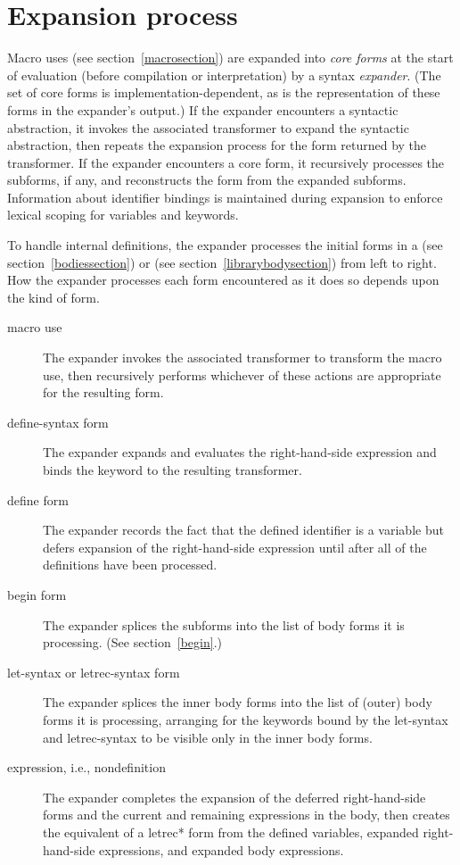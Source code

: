 \chapter{Expansion process}
\label{expansionchapter}

Macro uses (see section~\ref{macrosection}) are expanded into \textit{core
forms} at the start of evaluation (before compilation or interpretation)
by a syntax \emph{expander}.
(The set of core forms is implementation-dependent, as is the
representation of these forms in the expander's output.)
If the expander encounters a syntactic abstraction, it invokes
the associated transformer to expand the syntactic abstraction, then
repeats the expansion process for the form returned by the transformer.
If the expander encounters a core form, it recursively
processes the subforms, if any, and reconstructs the form from the
expanded subforms.
Information about identifier bindings is maintained during expansion
to enforce lexical scoping for variables and keywords.

To handle internal definitions, the expander processes the initial
forms in a  (see section~\ref{bodiessection}) or
 (see section~\ref{librarybodysection})
from left to
right.  How the expander processes each form encountered as it does so
depends upon the kind of form.

\begin{description}
\item[macro use]
The expander invokes the associated transformer to transform the macro
use, then recursively performs whichever of these actions are appropriate
for the resulting form.

\item[{\cf define-syntax} form]
The expander expands and evaluates the right-hand-side expression and binds the
keyword to the resulting transformer.

\item[{\cf define} form]
The expander records the fact that the defined identifier is a variable but defers
expansion of the right-hand-side expression until after all of the
definitions have been processed.

\item[{\cf begin} form]
The expander splices the subforms into the list of body forms it is
processing.  (See section~\ref{begin}.)

\item[{\cf let-syntax} or {\cf letrec-syntax} form]
The expander splices the inner body forms into the list of (outer) body forms it is
processing, arranging for the keywords bound by the {\cf let-syntax}
and {\cf letrec-syntax} to be visible only in the inner body forms.

\item[expression, i.e., nondefinition]
The expander completes the expansion of the deferred right-hand-side forms
and the current and remaining expressions in the body, then
creates the equivalent of a {\cf letrec*} form from the defined variables,
expanded right-hand-side expressions, and expanded body expressions.
\end{description}

